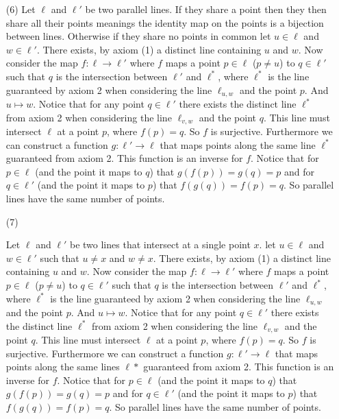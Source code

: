 \documentclass[12pt]{amsart}
\theoremstyle{definition}
\newcommand{\ra}{\rightarrow}
\begin{document}
\begin{itemize}
\item[(6)] Let $\ell$ and $\ell'$ be two parallel lines. If they share a point then they then share all their points meanings the identity map on the points is a bijection between lines. Otherwise if they share no points in common let $u\in \ell$ and $w\in \ell'$. There exists, by axiom (1) a distinct line containing $u$ and $w$. Now consider the map $f:\ell\ra\ell'$ where $f$ maps a point $p\in\ell$ ($p\neq u$) to $q\in\ell'$ such that $q$ is the intersection between $\ell'$ and $\ell^*$, where $\ell^*$ is the line guaranteed by axiom 2 when considering the line $\ell_{u,w}$ and the point $p$. And $u\mapsto w$. Notice that for any point $q\in\ell'$ there exists the distinct line $\ell^*$ from axiom 2 when considering the line $\ell_{v,w}$ and the point $q$. This line must intersect $\ell$ at a point $p$, where $f(p)=q$. So $f$ is surjective. Furthermore we can construct a function $g:\ell'\ra\ell$ that maps points along the same line $\ell^*$ guaranteed from axiom 2. This function is an inverse for $f$. Notice that for $p\in\ell$ (and the point it maps to $q$) that $g(f(p))=g(q)=p$ and for $q\in\ell'$ (and the point it maps to $p$) that $f(g(q))=f(p)=q$. So parallel lines have the same number of points.\\

\item[(7)]

 Let $\ell$ and $\ell'$ be two lines that intersect at a single point $x$. let $u\in \ell$ and $w\in \ell'$ such that $u\neq x$ and $w\neq x$. There exists, by axiom (1) a distinct line containing $u$ and $w$. Now consider the map $f:\ell\ra\ell'$ where $f$ maps a point $p\in\ell$ ($p\neq u$) to $q\in\ell'$ such that $q$ is the intersection between $\ell'$ and $\ell^*$, where $\ell^*$ is the line guaranteed by axiom 2 when considering the line $\ell_{u,w}$ and the point $p$. And $u\mapsto w$. Notice that for any point $q\in\ell'$ there exists the distinct line $\ell^*$ from axiom 2 when considering the line $\ell_{v,w}$ and the point $q$. This line must intersect $\ell$ at a point $p$, where $f(p)=q$. So $f$ is surjective. Furthermore we can construct a function $g:\ell'\ra\ell$ that maps points along the same lines $\ell*$ guaranteed from axiom 2. This function is an inverse for $f$. Notice that for $p\in\ell$ (and the point it maps to $q$) that $g(f(p))=g(q)=p$ and for $q\in\ell'$ (and the point it maps to $p$) that $f(g(q))=f(p)=q$. So parallel lines have the same number of points.\\


\end{itemize}
\end{document}
